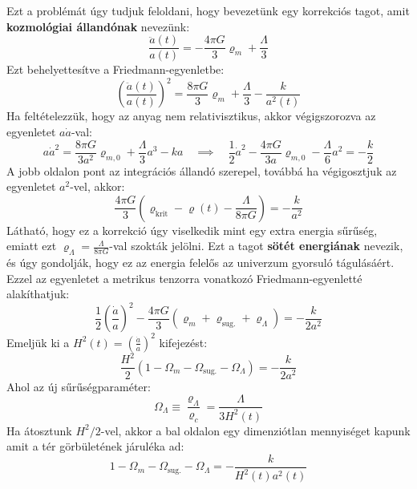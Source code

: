 \documentclass[../main.tex]{subfiles}
\begin{document}
Ezt a problémát úgy tudjuk feloldani, hogy bevezetünk egy korrekciós tagot, amit \textbf{kozmológiai állandónak} nevezünk:
\begin{equation}
    \frac{\ddot{a}(t)}{a(t)} = -\frac{4 \pi G}{3} \varrho_m + \frac{\Lambda}{3}
\end{equation}
Ezt behelyettesítve a Friedmann-egyenletbe:
\begin{equation}
    \left(\frac{\ddot{a}(t)}{a(t)}\right)^2 = \frac{8 \pi G}{3} \varrho_m + \frac{\Lambda}{3} - \frac{k}{a^2(t)}
\end{equation}
Ha feltételezzük, hogy az anyag nem relativisztikus, akkor végigszorozva az egyenletet $a\dot{a}$-val:
\begin{equation}
    a \dot{a}^2 = \frac{8 \pi G}{3 a^2} \varrho_{m, 0} + \frac{\Lambda}{3} a^3 - k a \quad \implies \quad \frac{1}{2} \dot{a}^2 - \frac{4 \pi G}{3a} \varrho_{m, 0} - \frac{\Lambda}{6} a^2 = -\frac{k}{2}
\end{equation}
A jobb oldalon pont az integrációs állandó szerepel, továbbá ha végigosztjuk az egyenletet $a^2$-vel, akkor:
\begin{equation}
    \frac{4 \pi G}{3} \left(\varrho_{\text{krit}} - \varrho(t) - \frac{\Lambda}{8 \pi G}\right) = - \frac{k}{a^2}
\end{equation}
Látható, hogy ez a korrekció úgy viselkedik mint egy extra energia sűrűség, emiatt ezt $\varrho_\Lambda = \frac{\Lambda}{8 \pi G}$-val szokták jelölni. Ezt a tagot \textbf{sötét energiának} nevezik, és úgy gondolják, hogy ez az energia felelős az univerzum gyorsuló tágulásáért.
Ezzel az egyenletet a metrikus tenzorra vonatkozó Friedmann-egyenletté alakíthatjuk:
\begin{equation}
    \frac{1}{2} \left(\frac{\dot{a}}{a}\right)^2 - \frac{4 \pi G}{3} \left(\varrho_m + \varrho_\text{sug.} + \varrho_\Lambda \right) = - \frac{k}{2 a^2}
\end{equation}
Emeljük ki a $H^2(t) = \left(\frac{\dot{a}}{a}\right)^2$ kifejezést:
\begin{equation}
    \frac{H^2}{2} \left(1 - \Omega_m - \Omega_\text{sug.} - \Omega_\Lambda \right) = - \frac{k}{2 a^2}
\end{equation}
Ahol az új sűrűségparaméter:
\begin{equation}
    \Omega_\Lambda \equiv \frac{\varrho_\Lambda}{\varrho_c} = \frac{\Lambda}{3 H^2(t)}
\end{equation}
Ha átosztunk $H^2/2$-vel, akkor a bal oldalon egy dimenziótlan mennyiséget kapunk amit a tér görbületének járuléka ad:
\begin{equation}
    1 - \Omega_m - \Omega_\text{sug.} - \Omega_\Lambda = - \frac{k}{H^2(t) a^2(t)}
\end{equation}
\end{document}
